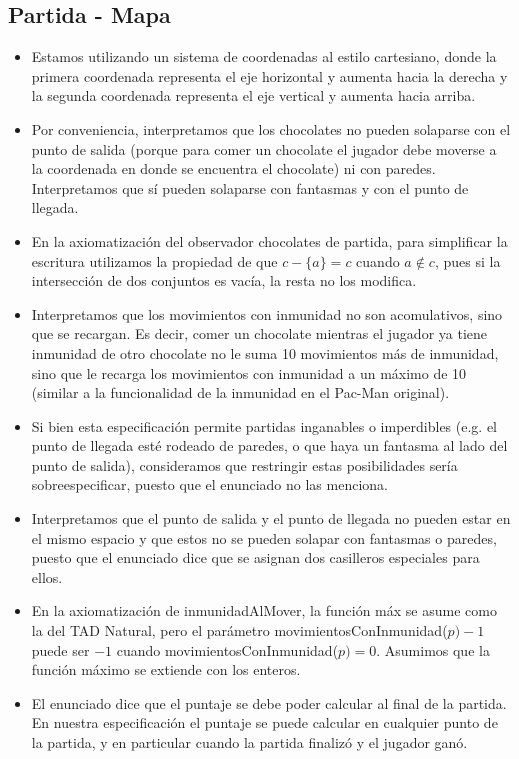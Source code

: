 \documentclass[10pt, a4paper]{article}
\begin{document}
\subsection{Partida - Mapa}
\begin{itemize}

\item Estamos utilizando un sistema de coordenadas al estilo cartesiano, donde la primera coordenada representa el eje horizontal y aumenta hacia la derecha
    y la segunda coordenada representa el eje vertical y aumenta hacia arriba.
\item Por conveniencia, interpretamos que los chocolates no pueden solaparse con el punto de salida (porque para comer un
chocolate el jugador debe moverse a la coordenada en donde se encuentra el chocolate) ni con paredes. Interpretamos que sí
pueden solaparse con fantasmas y con el punto de llegada.
\item En la axiomatización del observador chocolates de partida, para simplificar la escritura
utilizamos la propiedad de que $c - \{a\} = c$ cuando $a \notin c$, pues
si la intersección de dos conjuntos es vacía, la resta no los modifica.
\item Interpretamos que los movimientos con inmunidad no son acomulativos, sino que se recargan. Es decir, comer un chocolate
mientras el jugador ya tiene inmunidad de otro chocolate no le suma 10 movimientos más de inmunidad, sino que le recarga los
movimientos con inmunidad a un máximo de 10 (similar a la funcionalidad de la inmunidad en el Pac-Man original).
\item Si bien esta especificación permite partidas inganables o imperdibles (e.g. el punto de llegada esté rodeado de paredes, o que haya
un fantasma al lado del punto de salida), consideramos que restringir estas posibilidades sería sobreespecificar, puesto
que el enunciado no las menciona.
\item Interpretamos que el punto de salida y el punto de llegada no pueden estar en el mismo espacio y que estos
no se pueden solapar con fantasmas o paredes, puesto que el enunciado dice que se asignan dos casilleros especiales para ellos.
\item En la axiomatización de inmunidadAlMover, la función máx se asume como la del TAD Natural, pero el parámetro
movimientosConInmunidad($p) - 1$ puede ser $-1$ cuando movimientosConInmunidad($p) = 0$. Asumimos que la función máximo se extiende con los enteros.
\item El enunciado dice que el puntaje se debe poder calcular al final de la partida. En nuestra especificación el puntaje
se puede calcular en cualquier punto de la partida, y en particular cuando la partida finalizó y el jugador ganó.

\end{itemize}
\end{document}
